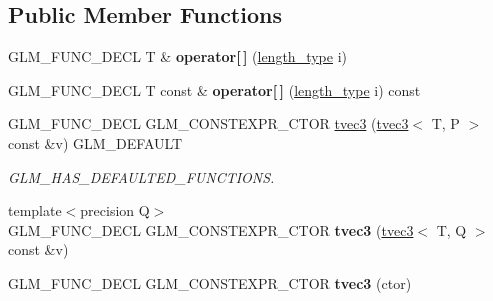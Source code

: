 \subsection*{Public Member Functions}
\begin{DoxyCompactItemize}
\item 
\mbox{\label{structglm_1_1tvec3_ae58fbe8fe435bdd4c928aa08442e7284}} 
G\+L\+M\+\_\+\+F\+U\+N\+C\+\_\+\+D\+E\+CL T \& {\bfseries operator\mbox{[}$\,$\mbox{]}} (\hyperlink{structglm_1_1tvec3_a3a79c6a1cfc9fb8821a0a878fa2de91a}{length\+\_\+type} i)
\item 
\mbox{\label{structglm_1_1tvec3_ae935b1220fdc0e692f0d971315f57a14}} 
G\+L\+M\+\_\+\+F\+U\+N\+C\+\_\+\+D\+E\+CL T const  \& {\bfseries operator\mbox{[}$\,$\mbox{]}} (\hyperlink{structglm_1_1tvec3_a3a79c6a1cfc9fb8821a0a878fa2de91a}{length\+\_\+type} i) const
\item 
\mbox{\label{structglm_1_1tvec3_ad648640117d2609264432d444b587833}} 
G\+L\+M\+\_\+\+F\+U\+N\+C\+\_\+\+D\+E\+CL G\+L\+M\+\_\+\+C\+O\+N\+S\+T\+E\+X\+P\+R\+\_\+\+C\+T\+OR \hyperlink{structglm_1_1tvec3_ad648640117d2609264432d444b587833}{tvec3} (\hyperlink{structglm_1_1tvec3}{tvec3}$<$ T, P $>$ const \&v) G\+L\+M\+\_\+\+D\+E\+F\+A\+U\+LT
\begin{DoxyCompactList}\small\item\em G\+L\+M\+\_\+\+H\+A\+S\+\_\+\+D\+E\+F\+A\+U\+L\+T\+E\+D\+\_\+\+F\+U\+N\+C\+T\+I\+O\+NS. \end{DoxyCompactList}\item 
\mbox{\label{structglm_1_1tvec3_a23aa4591c3b4e5036831d2d31c12725d}} 
{\footnotesize template$<$precision Q$>$ }\\G\+L\+M\+\_\+\+F\+U\+N\+C\+\_\+\+D\+E\+CL G\+L\+M\+\_\+\+C\+O\+N\+S\+T\+E\+X\+P\+R\+\_\+\+C\+T\+OR {\bfseries tvec3} (\hyperlink{structglm_1_1tvec3}{tvec3}$<$ T, Q $>$ const \&v)
\item 
\mbox{\label{structglm_1_1tvec3_acc749f04310a98570be6dae2c7e0cab7}} 
G\+L\+M\+\_\+\+F\+U\+N\+C\+\_\+\+D\+E\+CL G\+L\+M\+\_\+\+C\+O\+N\+S\+T\+E\+X\+P\+R\+\_\+\+C\+T\+OR {\bfseries tvec3} (ctor)
\item 
\mbox{\label{structglm_1_1tvec3_a1329577850d2744fd2ffca1cceed204e}} 

\end{DoxyCompactItemize}
